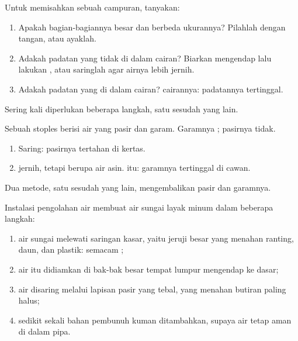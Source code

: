 \begin{method}\label{met:g3:separating-mixtures:choose}
Untuk memisahkan sebuah campuran, tanyakan:
\begin{enumerate}
  \item Apakah bagian-bagiannya besar dan berbeda ukurannya? Pilahlah
        dengan tangan, atau ayaklah.
  \item Adakah padatan yang tidak  di dalam cairan? Biarkan
        mengendap lalu lakukan , atau saringlah agar airnya
        lebih jernih.
  \item Adakah padatan yang  di dalam cairan?  cairannya:
        padatannya tertinggal.
\end{enumerate}
Sering kali diperlukan beberapa langkah, satu sesudah yang lain.
\end{method}

\begin{example}\label{ex:g3:separating-mixtures:three}
Sebuah stoples berisi air yang  pasir dan garam. Garamnya ;
pasirnya tidak.
\begin{enumerate}
  \item Saring: pasirnya tertahan di kertas.
  \item {} jernih, tetapi berupa air asin.   itu:
        garamnya tertinggal di cawan.
\end{enumerate}
Dua metode, satu sesudah yang lain, mengembalikan pasir dan garamnya.
\end{example}

\begin{example}\label{ex:g3:separating-mixtures:plant}
Instalasi pengolahan air membuat air sungai layak minum dalam beberapa
langkah:
\begin{enumerate}
  \item air sungai melewati saringan kasar, yaitu jeruji besar yang
        menahan ranting, daun, dan plastik: semacam ;
  \item air itu didiamkan di bak-bak besar tempat lumpur mengendap ke
        dasar;
  \item air disaring melalui lapisan pasir yang tebal, yang menahan
        butiran paling halus;
  \item sedikit sekali bahan pembunuh kuman ditambahkan, supaya air
        tetap aman di dalam pipa.
\end{enumerate}
\end{example}

